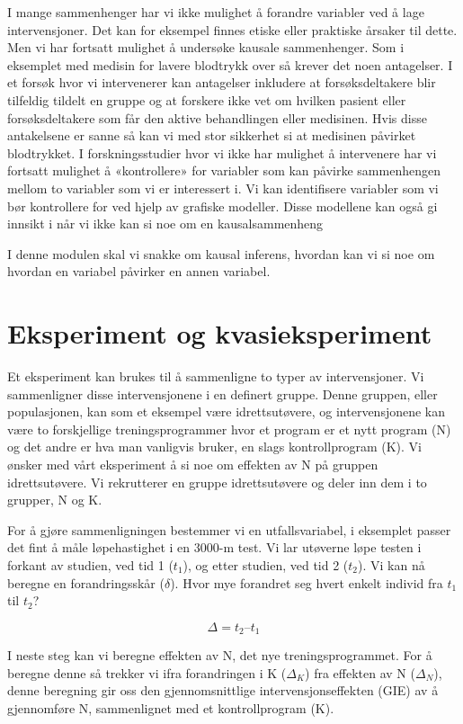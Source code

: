 \documentclass[
  letterpaper,
  DIV=11,
  numbers=noendperiod,
  oneside]{scrreprt}
\begin{document}
I mange sammenhenger har vi ikke mulighet å forandre variabler ved å
lage intervensjoner. Det kan for eksempel finnes etiske eller praktiske
årsaker til dette. Men vi har fortsatt mulighet å undersøke kausale
sammenhenger. Som i eksemplet med medisin for lavere blodtrykk over så
krever det noen antagelser. I et forsøk hvor vi intervenerer kan
antagelser inkludere at forsøksdeltakere blir tilfeldig tildelt en
gruppe og at forskere ikke vet om hvilken pasient eller forsøksdeltakere
som får den aktive behandlingen eller medisinen. Hvis disse antakelsene
er sanne så kan vi med stor sikkerhet si at medisinen påvirket
blodtrykket. I forskningsstudier hvor vi ikke har mulighet å intervenere
har vi fortsatt mulighet å «kontrollere» for variabler som kan påvirke
sammenhengen mellom to variabler som vi er interessert i. Vi kan
identifisere variabler som vi bør kontrollere for ved hjelp av grafiske
modeller. Disse modellene kan også gi innsikt i når vi ikke kan si noe
om en kausalsammenheng

I denne modulen skal vi snakke om kausal inferens, hvordan kan vi si noe
om hvordan en variabel påvirker en annen variabel.

\hypertarget{eksperiment-og-kvasieksperiment}{%
\section{Eksperiment og
kvasieksperiment}\label{eksperiment-og-kvasieksperiment}}

Et eksperiment kan brukes til å sammenligne to typer av intervensjoner.
Vi sammenligner disse intervensjonene i en definert gruppe. Denne
gruppen, eller populasjonen, kan som et eksempel være idrettsutøvere, og
intervensjonene kan være to forskjellige treningsprogrammer hvor et
program er et nytt program (N) og det andre er hva man vanligvis bruker,
en slags kontrollprogram (K). Vi ønsker med vårt eksperiment å si noe om
effekten av N på gruppen idrettsutøvere. Vi rekrutterer en gruppe
idrettsutøvere og deler inn dem i to grupper, N og K.

For å gjøre sammenligningen bestemmer vi en utfallsvariabel, i eksemplet
passer det fint å måle løpehastighet i en 3000-m test. Vi lar utøverne
løpe testen i forkant av studien, ved tid 1 (\(t_1\)), og etter studien,
ved tid 2 (\(t_2\)). Vi kan nå beregne en forandringsskår (\(\delta\)).
Hvor mye forandret seg hvert enkelt individ fra \(t_1\) til \(t_2\)?

\[\Delta = t_2 – t_1\]

I neste steg kan vi beregne effekten av N, det nye treningsprogrammet.
For å beregne denne så trekker vi ifra forandringen i K (\(\Delta_K\))
fra effekten av N (\(\Delta_N\)), denne beregning gir oss den
gjennomsnittlige intervensjonseffekten (GIE) av å gjennomføre N,
sammenlignet med et kontrollprogram (K).
\end{document}
